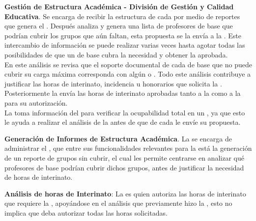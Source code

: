 \begin{ADescripcion}
	\item \textbf{Gestión de Estructura Académica - División de Gestión y Calidad Educativa}. Se encarga de recibir la estructura de cada  por medio de reportes que genera el . Después analiza y genera una lista de profesores de base que podrían cubrir los grupos que aún faltan, esta propuesta se la envía a la . Este intercambio de información se puede realizar varias veces hasta agotar todas las posibilidades de que un  de base cubra la necesidad y obtener la  aprobada.\\
	En este análisis se revisa que el soporte documental de cada  de base que no puede cubrir su carga máxima corresponda con algún  o . Todo este análisis contribuye a justificar las horas de interinato, incidencia u honorarios que solicita la .\\
    Posteriormente la  envía las horas de interinato aprobadas tanto a la  como a la  para su autorización.\\
    La  toma información del  para verificar la ocupabilidad total en un , ya que esto le ayuda a realizar el análisis de la   antes de que de cada  le envíe su propuesta.
    \item \textbf{Generación de Informes de Estructura Académica}. La  se encarga de administrar el , que entre sus funcionalidades relevantes para la  está la generación de un reporte de grupos sin cubrir, el cual les permite centrarse en analizar qué profesores de base podrían cubrir dichos grupos, antes de justificar la necesidad de horas de interinato.
    \item \textbf{Análisis de horas de Interinato}: La  es quien autoriza las horas de interinato que requiere la , apoyándose en el análisis que previamente hizo la , esto no implica que deba autorizar todas las horas solicitadas.

\end{ADescripcion}
